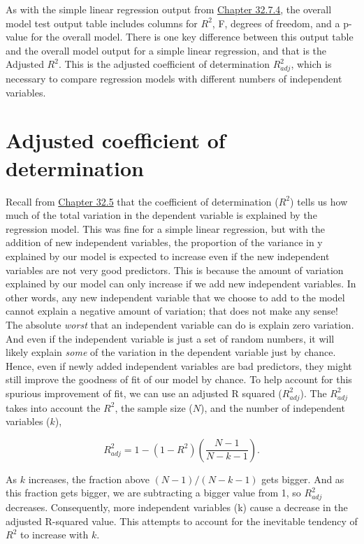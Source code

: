 \documentclass[
]{scrbook}
\begin{document}
As with the simple linear regression output from \protect\hyperlink{simple-regression-output}{Chapter 32.7.4}, the overall model test output table includes columns for \(R^{2}\), F, degrees of freedom, and a p-value for the overall model.
There is one key difference between this output table and the overall model output for a simple linear regression, and that is the Adjusted \(R^{2}\).
This is the adjusted coefficient of determination \(R^{2}_{adj}\), which is necessary to compare regression models with different numbers of independent variables.

\hypertarget{adjusted-coefficient-of-determination}{%
\section{Adjusted coefficient of determination}\label{adjusted-coefficient-of-determination}}

Recall from \protect\hyperlink{coefficient-of-determination}{Chapter 32.5} that the coefficient of determination (\(R^{2}\)) tells us how much of the total variation in the dependent variable is explained by the regression model.
This was fine for a simple linear regression, but with the addition of new independent variables, the proportion of the variance in y explained by our model is expected to increase even if the new independent variables are not very good predictors.
This is because the amount of variation explained by our model can only increase if we add new independent variables.
In other words, any new independent variable that we choose to add to the model cannot explain a negative amount of variation; that does not make any sense!
The absolute \emph{worst} that an independent variable can do is explain zero variation.
And even if the independent variable is just a set of random numbers, it will likely explain \emph{some} of the variation in the dependent variable just by chance.
Hence, even if newly added independent variables are bad predictors, they might still improve the goodness of fit of our model by chance.
To help account for this spurious improvement of fit, we can use an adjusted R squared (\(R^{2}_{adj}\)).
The \(R^{2}_{adj}\) takes into account the \(R^{2}\), the sample size (\(N\)), and the number of independent variables (\(k\)),

\[R^{2}_{adj} = 1 - \left(1 - R^{2}\right)\left(\frac{N - 1}{N - k - 1}\right).\]

As \(k\) increases, the fraction above \((N-1)/(N-k-1)\) gets bigger.
And as this fraction gets bigger, we are subtracting a bigger value from 1, so \(R^{2}_{adj}\) decreases.
Consequently, more independent variables (k) cause a decrease in the adjusted R-squared value.
This attempts to account for the inevitable tendency of \(R^{2}\) to increase with \(k\).
\end{document}
